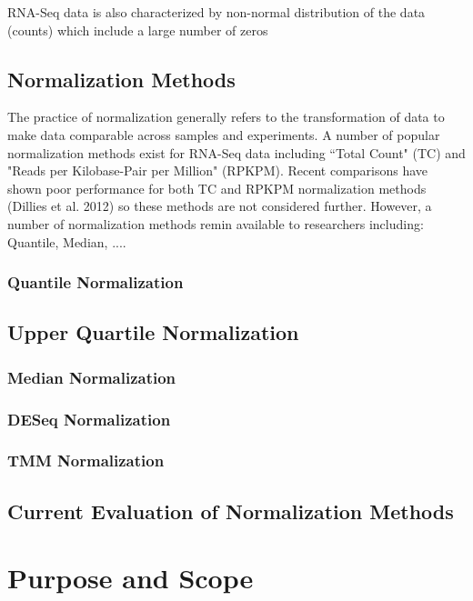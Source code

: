 \documentclass{book}\usepackage[]{graphicx}\usepackage[]{color}
\begin{document}
RNA-Seq data is also characterized by non-normal distribution of the data (counts) which include a large number of zeros 
 

\subsection{Normalization Methods}

The practice of normalization generally refers to the transformation of data to make data comparable across samples and experiments.  A number of popular normalization methods exist for RNA-Seq data including ``Total Count" (TC) and "Reads per Kilobase-Pair per Million" (RPKPM).  Recent comparisons have shown poor performance for both TC and RPKPM normalization methods (Dillies et al. 2012) so these methods are not considered further.  However, a number of normalization methods remin available to researchers including: Quantile, Median, ....  

\subsubsection{Quantile Normalization}

\subsection{Upper Quartile Normalization}

\subsubsection{Median Normalization}

\subsubsection{DESeq Normalization}

\subsubsection{TMM Normalization}



\subsection{Current Evaluation of Normalization Methods}

\section{Purpose and Scope}
\end{document}

